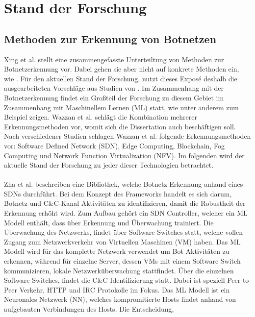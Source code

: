 \section{Stand der Forschung}
\label{sec:research}

\subsection*{Methoden zur Erkennung von Botnetzen}

Xing et al. \cite{Xing2021SurveyOB} stellt eine zusammengefasste Unterteiltung von Methoden zur Botnetzerkennung vor. Dabei gehen sie aber nicht auf konkrete Methoden
ein, wie \cite{Wazzan2021InternetOT}. Für den aktuellen Stand der Forschung, nutzt dieses Exposé deshalb die ausgearbeiteten Vorschläge aus Studien von \cite{Wazzan2021InternetOT}.
Im Zusammenhang mit der Botnetzerkennung findet ein Großteil der Forschung zu diesem Gebiet im Zusammenhang mit Maschinellem Lernen (ML) statt, wie unter anderem zum Beispiel
\cite{SAlrayes2022ModelingOB,DBLP:journals/comcom/Alani22,Habtamu2022ASR} zeigen. Wazzan et al. \cite{Wazzan2021InternetOT} schlägt die Kombination 
mehrerer Erkennungsmethoden vor, womit sich die Dissertation auch beschäftigen soll. Nach verschiedener Studien schlagen Wazzan et al. folgende Erkennungsmethoden vor: 
Software Defined Network (SDN), Edge Computing, Blockchain, Fog Computing und Network Function Virtualization (NFV). Im folgenden wird der aktuelle Stand der Forschung zu jeder dieser 
Technologien betrachtet. \\ \\ Zha et al. \cite{DBLP:conf/cns/Zha0GMC19} beschreiben eine Bibliothek, welche Botnetz Erkennung anhand eines SDNs durchführt. 
Bei dem Konzept des Frameworks handelt es sich darum, Botnetz und C\&C-Kanal Aktivitäten zu identifizieren, damit die Robustheit der Erkennung erhöht wird. Zum Aufbau gehört ein SDN 
Controller, welcher ein ML Modell enthält, dass über Erkennung und Überwachung trainiert. Die Überwachung des Netzwerks, findet über Software Switches statt, welche vollen Zugang zum 
Netzwerkverkehr von Virtuellen Maschinen (VM) haben. Das ML Modell wird für das komplette Netzwerk verwendet um Bot Aktivitäten zu erkennen, während für einzelne Server, dessen VMs mit 
einem Software Switch kommunizieren, lokale Netzwerküberwachung stattfindet. Über die einzelnen Software Switches, findet die C\&C Identifizierung statt. Dabei ist speziell Peer-to-Peer 
Verkehr, HTTP und IRC Protokolle im Fokus. Das ML Modell ist ein Neuronales Netzwerk (NN), welches kompromitierte Hosts findet anhand von aufgebauten Verbindungen des Hosts. Die Entscheidung, 
